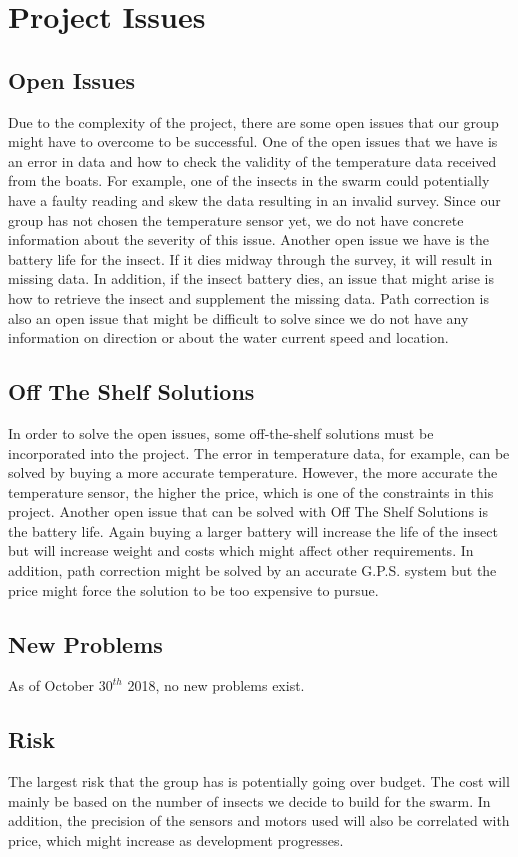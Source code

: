 \documentclass[11pt]{article}
\begin{document}
\section{Project Issues}
\subsection{Open Issues}
Due to the complexity of the project, there are some open issues that our group might have to overcome to be successful. One of the open issues that we have is an error in data and how to check the validity of the temperature data received from the boats. For example, one of the insects in the swarm could potentially have a faulty reading and skew the data resulting in an invalid survey. Since our group has not chosen the temperature sensor yet, we do not have concrete information about the severity of this issue. Another open issue we have is the battery life for the insect. If it dies midway through the survey, it will result in missing data. In addition, if the insect battery dies, an issue that might arise is how to retrieve the insect and supplement the missing data. Path correction is also an open issue that might be difficult to solve since we do not have any information on direction or about the water current speed and location. 
\subsection{Off The Shelf Solutions}
In order to solve the open issues, some off-the-shelf solutions must be incorporated into the project. The error in temperature data, for example, can be solved by buying a more accurate temperature. However, the more accurate the temperature sensor, the higher the price, which is one of the constraints in this project. Another open issue that can be solved with Off The Shelf Solutions is the battery life. Again buying a larger battery will increase the life of the insect but will increase weight and costs which might affect other requirements. In addition, path correction might be solved by an accurate G.P.S. system but the price might force the solution to be too expensive to pursue. 
\subsection{New Problems}
As of October $30^{th}$ 2018, no new problems exist.
\subsection{Risk}
The largest risk that the group has is potentially going over budget. The cost will mainly be based on the number of insects we decide to build for the swarm. In addition, the precision of the sensors and motors used will also be correlated with price, which might increase as development progresses. 
\end{document}
